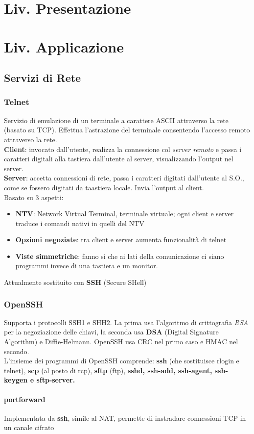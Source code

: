 \documentclass[a4paper,11pt]{article}
\def\para#1{\paragraph{#1}\label{#1}}
\begin{document}
\section{Liv. Presentazione}\newpage
\section{Liv. Applicazione}
\subsection{Servizi di Rete}
\subsubsection{Telnet}
Servizio di emulazione di un terminale a carattere ASCII attraverso la rete (basato su TCP). Effettua l'astrazione del terminale consentendo l'accesso remoto attraverso la rete.\\
\textbf{Client}: invocato dall'utente, realizza la connessione col \textit{server remoto} e passa i caratteri digitali alla tastiera dall'utente al server, visualizzando l'output nel server.\\
\textbf{Server}: accetta connessioni di rete, passa i caratteri digitati dall'utente al S.O., come se fossero digitati da taastiera locale. Invia l'output al client.\\
Basato su 3 aspetti:
\begin{itemize}
\item\textbf{NTV}: Network Virtual Terminal, terminale virtuale; ogni client e server traduce i comandi nativi in quelli del NTV
\item\textbf{Opzioni negoziate}: tra client e server aumenta funzionalità di telnet
\item\textbf{Viste simmetriche}: fanno si che ai lati della comunicazione ci siano programmi invece di una tastiera e un monitor.
\end{itemize}
Attualmente sostituito con \textbf{SSH} (Secure SHell)
\subsubsection{OpenSSH}
Supporta i protocolli SSH1 e SHH2. La prima usa l'algoritmo di crittografia \textit{RSA} per la negoziazione delle chiavi, la seconda usa \textbf{DSA} (Digital Signature Algorithm) e Diffie-Helmann. OpenSSH usa CRC nel primo caso e HMAC nel secondo.\\
L'insieme dei programmi di OpenSSH comprende: \textbf{ssh} (che sostituisce rlogin e telnet), \textbf{scp} (al posto di rcp), \textbf{sftp} (ftp), \textbf{sshd, ssh-add, ssh-agent, ssh-keygen e sftp-server.}
\para{portforward} Implementata da \textbf{ssh}, simile al NAT, permette di instradare connessioni TCP in un canale cifrato
\end{document}
